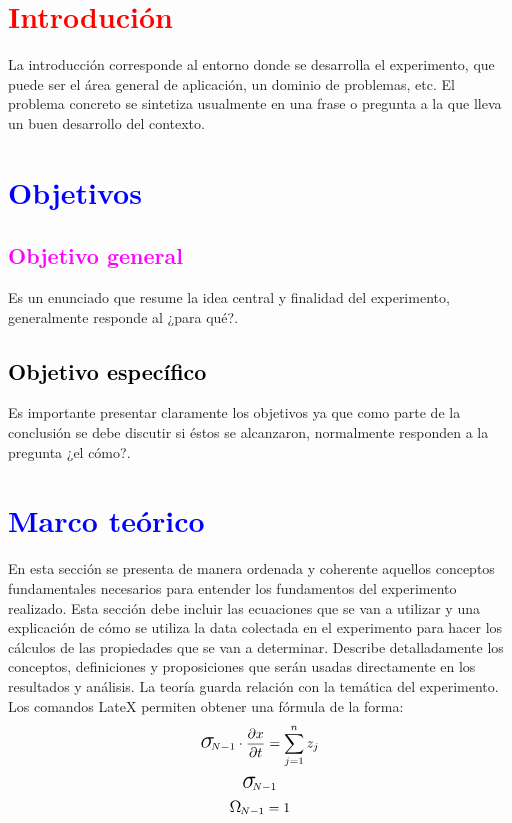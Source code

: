 \documentclass[11pt]{article}
\begin{document}
\begin{multicols}{2}
\section{\textbf{\textcolor{red}{Introdución}}}
\noindent La introducción corresponde al entorno donde se desarrolla el experimento, que puede ser el área general de aplicación, un dominio de problemas, etc. El problema concreto se sintetiza usualmente en una frase o pregunta a la que lleva un buen desarrollo del contexto.
\section{\textbf{\textcolor{blue}{Objetivos}}}
\subsection{\textcolor{magenta}{Objetivo general}}
\noindent Es un enunciado que resume la idea central y finalidad del experimento, generalmente responde al ¿para qué?.
\subsection{\textbf{\textcolor{black}{Objetivo específico}}}
\noindent Es importante presentar claramente los objetivos ya que como parte de la conclusión se debe discutir si éstos se alcanzaron, normalmente responden a la pregunta ¿el cómo?.
\section{\textbf{\textcolor{blue}{Marco teórico}}}
\noindent En esta sección se presenta de manera ordenada y coherente aquellos conceptos fundamentales necesarios para entender los fundamentos del experimento realizado. Esta sección debe incluir las ecuaciones que se van a utilizar y una explicación de cómo se utiliza la data colectada en el experimento para hacer los cálculos de las propiedades que se van a determinar. Describe detalladamente los conceptos, definiciones y proposiciones que serán usadas directamente en los resultados y análisis. La teoría guarda relación con la temática del experimento.\\
Los comandos LateX permiten obtener una fórmula de la forma: 
\begin{equation}
\textup{\LARGE $\sigma$}_{\hspace{-0.1cm}N-1} \cdot \frac{\partial x}{\partial t} = \sum_{j=1}^{n}z_{j}
\end{equation}
\begin{equation}
\textup{\LARGE $\sigma$}_{\hspace{-0.1cm}N-1}
\end{equation}
\begin{equation}
\textup{\large $\Omega$}_{\hspace{-0.03cm}N-1}=1
\end{equation}


\end{multicols}
\end{document}
